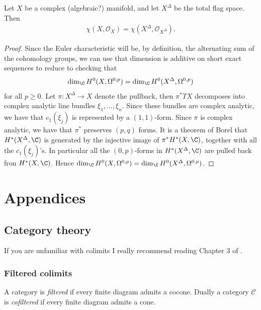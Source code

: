 \documentclass[11pt]{book}
\begin{document}
\begin{theorem}
Let $X$ be a complex (algebraic?) manifold, and let $X^\Delta$ be the total flag space. Then
\begin{align*}
    \chi(X,\mathcal{O}_X) = \chi(X^\Delta, \mathcal{O}_{X^\Delta}).
\end{align*}
\end{theorem}
\begin{proof} Since the Euler characteristic will be, by definition, the alternating sum of the cohomology groups, we can use that dimension is additive on short exact sequences to reduce to checking that
\begin{align*}
    \dim_\C H^0(X,\Omega^{0,p}) = \dim_\C H^0(X^\Delta, \Omega^{0,p})
\end{align*}
for all $p\ge0$. Let $\pi \colon X^\Delta \to X$ denote the pullback, then $\pi^\ast TX$ decomposes into complex analytic line bundles $\xi_1, \ldots, \xi_n$. Since these bundles are complex analytic, we have that $c_1(\xi_j)$ is represented by a $(1,1)$-form. Since $\pi$ is complex analytic, we have that $\pi^\ast$ preserves $(p,q)$ forms. It is a theorem of Borel that $H^\ast(X^\Delta,\C)$ is generated by the injective image of $\pi^\ast H^\ast(X,\C)$, together with all the $c_1(\xi_j)$'s. In particular all the $(0,p)$-forms in $H^\ast(X^\Delta,\C)$ are pulled back fron $H^\ast(X,\C)$. Hence $\dim_\C H^0(X,\Omega^{0,p}) = \dim_\C H^0(X^\Delta, \Omega^{0,p})$.
\end{proof}








\newpage
\appendix
\chapter{Appendices}
\minitoc
\section{Category theory}
If you are unfamiliar with colimits I really recommend reading Chapter 3 of \cite{riehlCategoryTheoryContext2016}.

\subsection{Filtered colimits}

\begin{definition} A category is \emph{filtered} if every finite diagram admits a cocone. Dually a category $\mathscr{C}$ is \emph{cofiltered} if every finite diagram admits a cone.
\end{definition}
\end{document}
